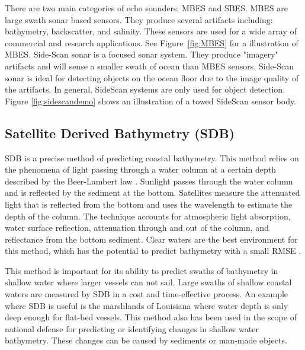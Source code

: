 There are two main categories of echo sounders: \ac{MBES} and \ac{SBES}.
\ac{MBES} are large swath sonar based sensors.
They produce several artifacts including: bathymetry, backscatter, and salinity.
These sensors are used for a wide array of commercial and research applications.
See Figure~\ref{fig:MBES} for a illustration of \ac{MBES}.
Side-Scan sonar is a focused sonar system.
They produce "imagery" artifacts and will sense a smaller swath of ocean than \ac{MBES} sensors.
Side-Scan sonar is ideal for detecting objects on the ocean floor due to the image quality of the artifacts.
In general, SideScan systems are only used for object detection.
Figure \ref{fig:sidescandemo} shows an illustration of a towed SideScan sensor body.




\subsection{Satellite Derived Bathymetry (SDB)}
\ac{SDB} is a precise method of predicting coastal bathymetry. 
This method relies on the phenomena of light passing through a water column at a certain depth described by the Beer-Lambert law \cite{chybicki2018three}\cite{vinayaraj2016satellite}.
Sunlight passes through the water column and is reflected by the sediment at the bottom.
Satellites measure the attenuated light that is reflected from the bottom and uses the wavelength to estimate the depth of the column.
The technique accounts for atmospheric light absorption, water surface reflection, attenuation through and out of the column, and reflectance from the bottom sediment.
Clear waters are the best environment for this method, which has the potential to predict bathymetry with a small RMSE \cite{chybicki2018three}.


\par
This method is important for its ability to predict swaths of bathymetry in shallow water where larger vessels can not sail.
Large swaths of shallow coastal waters are measured by \ac{SDB} in a cost and time-effective process.
An example where \ac{SDB} is useful is the marshlands of Louisiana where water depth is only deep enough for flat-bed vessels.
This method also has been used in the scope of national defense for predicting or identifying changes in shallow water bathymetry.
These changes can be caused by sediments or man-made objects. 

